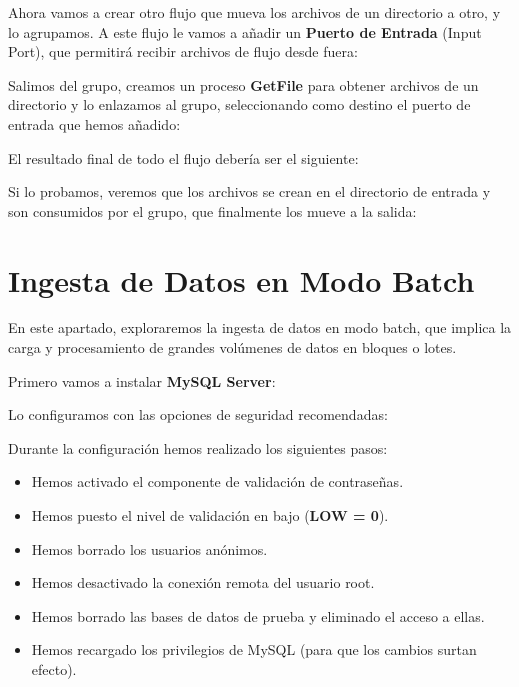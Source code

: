 \documentclass{../../miPlantilla}
\begin{document}
Ahora vamos a crear otro flujo que mueva los archivos de un directorio a otro, y lo agrupamos. A este flujo le vamos a añadir un \textbf{Puerto de Entrada} (Input Port), que permitirá recibir archivos de flujo desde fuera:


Salimos del grupo, creamos un proceso \textbf{GetFile} para obtener archivos de un directorio y lo enlazamos al grupo, seleccionando como destino el puerto de entrada que hemos añadido:


\newpage

El resultado final de todo el flujo debería ser el siguiente:


Si lo probamos, veremos que los archivos se crean en el directorio de entrada y son consumidos por el grupo, que finalmente los mueve a la salida:


\newpage

\section{Ingesta de Datos en Modo Batch}
En este apartado, exploraremos la ingesta de datos en modo batch, que implica la carga y procesamiento de grandes volúmenes de datos en bloques o lotes.

Primero vamos a instalar \textbf{MySQL Server}:


Lo configuramos con las opciones de seguridad recomendadas:


Durante la configuración hemos realizado los siguientes pasos:
\begin{itemize}
    \item Hemos activado el componente de validación de contraseñas.
    \item Hemos puesto el nivel de validación en bajo (\textbf{LOW = 0}).
    \item Hemos borrado los usuarios anónimos.
    \item Hemos desactivado la conexión remota del usuario root.
    \item Hemos borrado las bases de datos de prueba y eliminado el acceso a ellas.
    \item Hemos recargado los privilegios de MySQL (para que los cambios surtan efecto).
\end{itemize}
\end{document}
